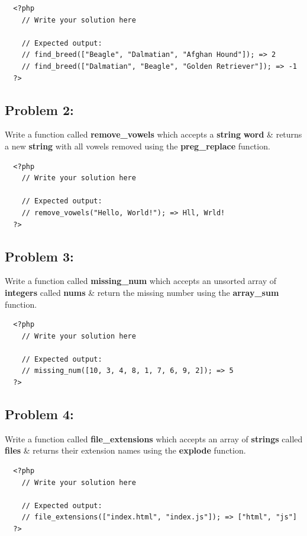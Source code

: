 \documentclass{article}
\begin{document}
\begin{verbatim}
  <?php
    // Write your solution here

    // Expected output:
    // find_breed(["Beagle", "Dalmatian", "Afghan Hound"]); => 2
    // find_breed(["Dalmatian", "Beagle", "Golden Retriever"]); => -1
  ?>
\end{verbatim}

\subsection*{Problem 2:} 
Write a function called \textbf{remove\_vowels} which accepts a \textbf{string} \textbf{word} \& returns a new \textbf{string} with all vowels removed using the \textbf{preg\_replace} function.

\begin{verbatim}
  <?php
    // Write your solution here

    // Expected output:
    // remove_vowels("Hello, World!"); => Hll, Wrld!
  ?>
\end{verbatim}

\subsection*{Problem 3:} 
Write a function called \textbf{missing\_num} which accepts an unsorted array of \textbf{integers} called \textbf{nums} \& return the missing number using the \textbf{array\_sum} function.

\begin{verbatim}
  <?php
    // Write your solution here

    // Expected output:
    // missing_num([10, 3, 4, 8, 1, 7, 6, 9, 2]); => 5
  ?>
\end{verbatim}

\subsection*{Problem 4:}
Write a function called \textbf{file\_extensions} which accepts an array of \textbf{strings} called \textbf{files} \& returns their extension names using the \textbf{explode} function.

\begin{verbatim}
  <?php
    // Write your solution here

    // Expected output:
    // file_extensions(["index.html", "index.js"]); => ["html", "js"]
  ?>
\end{verbatim}
\end{document}
